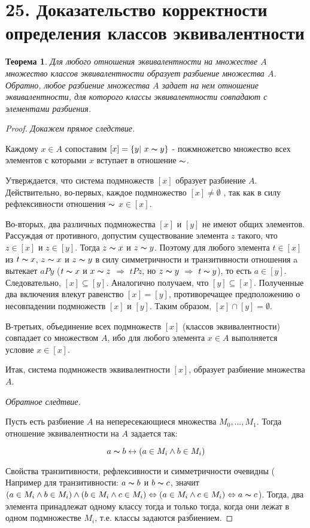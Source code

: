 \documentclass[a4paper,12pt]{article}
\newtheorem*{theorem}{Теорема}
\begin{document}
        \section*{25. Доказательство корректности определения классов эквивалентности}
        \begin{theorem}
            Для любого отношения эквивалентности на множестве $A$ множество классов эквивалентности образует разбиение множества $A$. Обратно, любое разбиение множества $A$ задает на нем отношение эквивалентности, для которого классы эквивалентности совпадают с элементами разбиения.
        \end{theorem}

        \begin{proof}
            \textit{Докажем прямое следствие.}

            Каждому $x \in A$ сопоставим $[x] = \{y|\ x\thicksim y\}$ - пожмножетсво множество всех элементов с которыми $x$ вступает в отношение $\thicksim $.

            Утверждается, что система подмножеств $[x]$ образует разбиение $A$. Действительно, во-первых, каждое подмножество $[x] \ne \emptyset$ , так как в силу рефлексивности отношения $\thicksim $  $x \in [x]$.   

            Во-вторых,  два различных подмножества $[x]$ и $[y]$ не имеют общих элементов. Рассуждая от противного, допустим существование элемента $z$ такого, что $z \in [x]$ и $z \in [y]$. Тогда $z\thicksim x$ и $z\thicksim y$. Поэтому для любого элемента $t \in [x]$ из $t\thicksim x$, $z\thicksim x$ и $z\thicksim y$ в силу симметричности и транзитивности отношения a вытекает $aPy$ ($t\thicksim x$ и $x\thicksim z$ $\Rightarrow$ $tPz$, но $z\thicksim y$ $\Rightarrow$ $t\thicksim y$), то есть $a \in [y]$. Следовательно, $[x] \subseteq [y]$. Аналогично получаем, что $[y] \subseteq [x]$. Полученные два включения влекут равенство $[x] = [y]$, противоречащее предположению о несовпадении подмножеств $[x]$ и $[y]$. Таким образом, $[x] \cap [y] = \emptyset$.

            В-третьих, объединение всех подмножеств $[x]$ (классов эквивалентности) совпадает со множеством $A$, ибо для любого элемента $x \in A$ выполняется условие $x \in [x]$.

            Итак, система подмножеств эквивалентности $[x]$, образует разбиение множества $A$.

            \textit{Обратное следтвие.}

            Пусть есть разбиение $A$ на непересекающиеся множества $M_0, \ldots, M_1$. Тогда отношение эквивалентности на $A$ задается так:

            $$a \thicksim b \leftrightarrow (a \in M_i \wedge b \in M_i)$$

             Свойства транзитивности, рефлексивности и симметричности очевидны ( Например для транзитивности: $a \thicksim b$ и $b \thicksim c$, значит $(a \in M_i \wedge b \in M_i) \wedge (b \in M_i \wedge c \in M_i) \Leftrightarrow (a \in M_i \wedge c \in M_i) \Leftrightarrow a \thicksim c$). Тогда, два элемента принадлежат одному классу тогда и только тогда, когда они лежат в одном подмножестве $M_i$, т.е. классы задаются разбиением.
        \end{proof}
\end{document}
